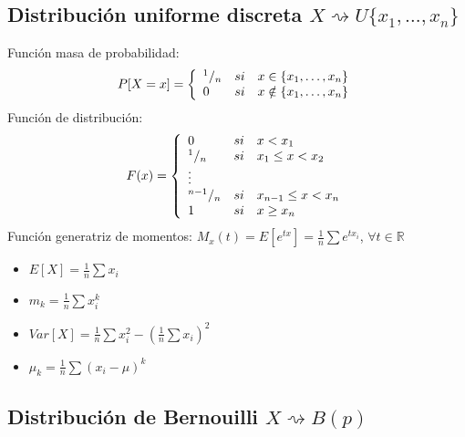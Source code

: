 \documentclass[11pt,twoside,titlepage,a4paper]{article}
\theoremstyle{definition}
\theoremstyle{plain_rojo}
\theoremstyle{remark}
\begin{document}
\subsection{Distribución uniforme discreta $X\rightsquigarrow U\{x_1,\ldots,x_n\}$}

Función masa de probabilidad:
\begin{equation*}
P[X=x]=\left\{
	\begin{array}{l c l}
	^1/_n & si & x\in\{x_1,\ldots,x_n\} \\
	0 & si & x\notin\{x_1,\ldots,x_n\}
	\end{array}
\right.
\end{equation*}
Función de distribución:
\begin{equation*}
F(x)=\left\{
	\begin{array}{l c l}
	0 & si & x<x_1 \\
	^1/_n & si & x_1\leq x<x_2 \\
	\vdots && \\
	^{n-1}/_n & si & x_{n-1}\leq x<x_n \\
	1 & si & x\geq x_n
	\end{array}
\right.
\end{equation*}
Función generatriz de momentos: $M_x(t)=E[e^{tx}]=\frac 1n\sum e^{tx_i}$, $\forall t\in\mathbb{R}$
\begin{multicols}{2}
	\begin{itemize}[label={}]
		\item $E[X]=\frac 1n\sum x_i$
		\item $m_k=\frac 1n\sum x_i^k$
		\item $Var[X]=\frac 1n\sum x_i^2-(\frac 1n\sum x_i)^2$
		\item $\mu_k=\frac 1n\sum(x_i-\mu)^k$
	\end{itemize}
\end{multicols}

\subsection{Distribución de Bernouilli $X\rightsquigarrow B(p)$}
\end{document}
